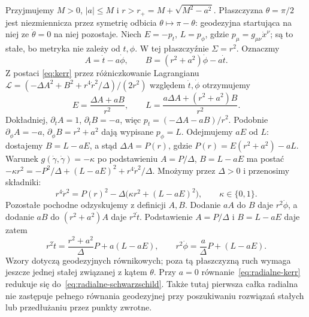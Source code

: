 \begin{przyklad}
\label{prz:geodezyjne-kerr}
Przyjmujemy $M>0$, $|a|\leq M$ i $r>r_+=M+\sqrt{M^2-a^2}$.
Płaszczyzna $\theta=\pi/2$ jest niezmiennicza
przez symetrię odbicia $\theta\mapsto\pi-\theta$:
geodezyjna startująca na niej ze
$\dot\theta=0$ na niej pozostaje.
Niech $E=-p_t$, $L=p_\phi$, gdzie
$p_\mu=g_{\mu\nu}\dot x^\nu$; są to stałe,
bo metryka nie zależy od $t,\phi$.
W tej płaszczyźnie $\Sigma=r^2$. Oznaczmy
\[
 A=\dot t-a\dot\phi,
 \qquad B=(r^2+a^2)\dot\phi-a\dot t.
\]
Z postaci \eqref{eq:kerr} przez różniczkowanie
Lagrangianu
$\mathcal L=(-\Delta A^2+B^2+r^4\dot r^2/\Delta)/(2r^2)$
względem $\dot t,\dot\phi$
otrzymujemy
\[
 E=\frac{\Delta A+aB}{r^2},
 \qquad
 L=\frac{a\Delta A+(r^2+a^2)B}{r^2}.
\]
Dokładniej,
$\partial_{\dot t}A=1$, $\partial_{\dot t}B=-a$,
więc $p_t=(-\Delta A-aB)/r^2$.
Podobnie $\partial_{\dot\phi}A=-a$,
$\partial_{\dot\phi}B=r^2+a^2$ dają wypisane $p_\phi=L$.
Odejmujemy $aE$ od $L$: dostajemy
$B=L-aE$, a stąd $\Delta A=P(r)$,
gdzie $P(r)=E(r^2+a^2)-aL$.
Warunek $g(\dot\gamma,\dot\gamma)=-\kappa$
po podstawieniu $A=P/\Delta$, $B=L-aE$ ma postać
$-\kappa r^2=-P^2/\Delta+(L-aE)^2+r^4\dot r^2/\Delta$.
Mnożymy przez $\Delta>0$ i przenosimy składniki:
\begin{equation}\label{eq:radialne-kerr}
 r^4\dot r^2=P(r)^2
        -\Delta\bigl(\kappa r^2+(L-aE)^2\bigr),
 \qquad \kappa\in\{0,1\}.
\end{equation}
Pozostałe pochodne odzyskujemy z definicji $A,B$.
Dodanie $aA$ do $B$ daje $r^2\dot\phi$,
a dodanie $aB$ do $(r^2+a^2)A$ daje $r^2\dot t$.
Podstawienie $A=P/\Delta$ i $B=L-aE$ daje zatem
\begin{equation}\label{eq:tphi-kerr}
 r^2\dot t=\frac{r^2+a^2}{\Delta}P+a(L-aE),
 \qquad
 r^2\dot\phi=\frac a\Delta P+(L-aE).
\end{equation}
Wzory dotyczą geodezyjnych równikowych;
poza tą płaszczyzną ruch wymaga jeszcze
jednej stałej związanej z kątem $\theta$.
Przy $a=0$ równanie~\eqref{eq:radialne-kerr}
redukuje się do~\eqref{eq:radialne-schwarzschild}.
Także tutaj pierwsza całka radialna nie zastępuje pełnego
równania geodezyjnej przy poszukiwaniu rozwiązań stałych
lub przedłużaniu przez punkty zwrotne.


\end{przyklad}
